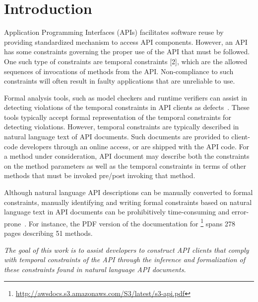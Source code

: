 \section{Introduction}
\label{sec:introduction}

Application Programming Interfaces (APIs) facilitates software reuse
by providing standardized mechanism to access API components.
However, an API has some constraints governing the proper use of the API that must be followed.
One such type of constraints are temporal constraints [2], which are the allowed sequences of invocations of methods from the API.
Non-compliance to such constraints will often result in faulty applications that are unreliable to use. %

Formal analysis tools, such as model checkers and runtime verifiers 
can assist in detecting violations of the temporal constraints
in API clients as defects~\cite{lee2012towards}.
These tools typically accept formal representation of the temporal constraints for detecting violations.
However, temporal constraints are typically described in natural language text of API documents.
Such documents are provided to client-code developers through an online access, or are shipped with the API code.
For a method under consideration, API document may describe both the constraints on the method parameters
as well as the temporal constraints in terms of other methods that must be invoked pre/post invoking that method.

Although natural language API descriptions can be manually converted to formal constraints,
manually identifying and writing formal constraints based on natural language text in API documents can be prohibitively time-consuming and error-prone~\cite{wu2013inferring,RubingerWEB10}. 
For instance, the PDF version of the documentation for \amazonAPI\footnote{{\small \url{http://awsdocs.s3.amazonaws.com/S3/latest/s3-api.pdf}}} spans 278 pages describing 51 methods.

\textit{The goal of this work is to assist developers to construct API clients that comply with temporal constraints of the API through the inference and formalization of these constraints found in natural language API documents.}

